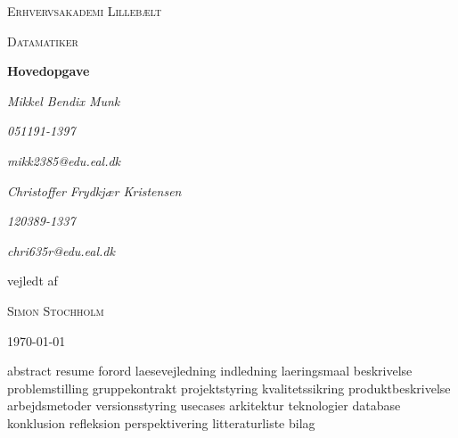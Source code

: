 \documentclass[a4paper, 11pt, danish]{report}
\begin{document}
\begin{titlepage}
    \centering
    {\scshape\LARGE Erhvervsakademi Lillebælt \par}
    \vspace{1cm}
    {\scshape\Large Datamatiker\par}
    \vspace{1.5cm}
    {\huge\bfseries Hovedopgave\par}
    \vspace{2cm}
    {\Large\itshape Mikkel Bendix Munk\par}
    {\small\itshape 051191-1397\par}
    {\small\itshape mikk2385@edu.eal.dk\par}
    {\Large\itshape Christoffer Frydkjær Kristensen\par}
    {\small\itshape 120389-1337\par}
    {\small\itshape chri635r@edu.eal.dk\par}
    \vfill
    vejledt af\par
    \textsc{Simon Stochholm}

    \vfill

    {\large \today\par}
\end{titlepage}
\tableofcontents{}
\newpage
{abstract}
{resume}
{forord}
{laesevejledning}
{indledning}
{laeringsmaal}
{beskrivelse}
{problemstilling}
{gruppekontrakt}
{projektstyring}
{kvalitetssikring}
{produktbeskrivelse}
{arbejdsmetoder}
{versionsstyring}
{usecases}
{arkitektur}
{teknologier}
{database}
{konklusion}
{refleksion}
{perspektivering}
{litteraturliste}
{bilag}
\end{document}
